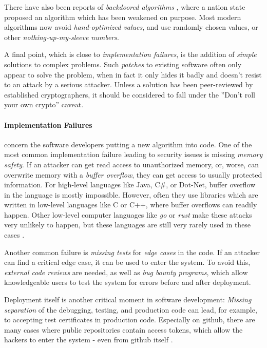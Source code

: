 There have also been reports of \emph{backdoored algorithms} \cite{DualEC},
where a nation state proposed an algorithm which has been weakened on purpose.
Most modern algorithms now avoid \emph{hand-optimized values}, and use
randomly chosen values, or other \emph{nothing-up-my-sleeve numbers}\cite{Salsa20}.

A final point, which is close to \emph{implementation failures}, is the addition
of \emph{simple} solutions to complex problems.
Such \emph{patches} to existing software often only appear to solve the problem,
when in fact it only hides it badly and doesn't resist to an attack by a serious
attacker.
Unless a solution has been peer-reviewed by established cryptographers, it should
be considered to fall under the ''Don't roll your own crypto'' \cite{SchneierLaw11} caveat.

\paragraph{Implementation Failures} concern the software developers putting a new
algorithm into code.
One of the most common implementation failure leading to security issues is missing
\emph{memory safety}.
If an attacker can get read access to unauthorized memory, or, worse, can overwrite
memory with a \emph{buffer overflow}, they can get access to usually protected
information.
For high-level languages like Java, C\#, or Dot-Net, buffer overflow in the language
is mostly impossible.
However, often they use libraries which are written in low-level languages like
C or C++, where buffer overflows can readily happen.
Other low-level computer languages like \emph{go} or \emph{rust} make these attacks very unlikely
to happen, but these languages are still very rarely used in these cases \cite{HeartbleedXKCD}.

Another common failure is \emph{missing tests} for \emph{edge cases} in the code.
If an attacker can find a critical edge case, it can be used to enter the system.
To avoid this, \emph{external code reviews} are needed, as well as \emph{bug bounty programs},
which allow knowledgeable users to test the system for errors before and after
deployment.

Deployment itself is another critical moment in software development:
\emph{Missing separation} of the debugging, testing, and production code can lead, for
example, to accepting test certificates in production code.
Especially on github, there are many cases where public repositories contain
access tokens, which allow the hackers to enter the system - even from
github itself \cite{GithubPrivate23}.

